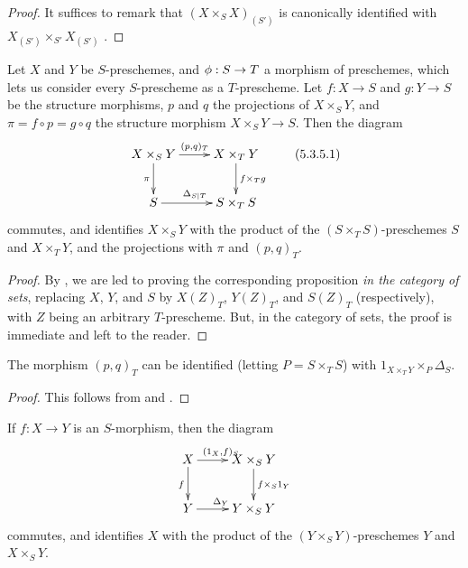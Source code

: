 \begin{proof}
It suffices to remark that $(X\times_S X)_{(S')}$ is canonically identified with $X_{(S')}\times_{S'}X_{(S')}$ .
\end{proof}

\begin{proposition}[5.3.5]
\label{I.5.3.5}
Let $X$ and $Y$ be $S$-preschemes, and $\vphi:S\to T$ a morphism of preschemes, which lets us consider every $S$-prescheme as a $T$-prescheme.
Let $f:X\to S$ and $g:Y\to S$ be the structure morphisms, $p$ and $q$ the projections of $X\times_S Y$, and $\pi=f\circ p=g\circ q$ the structure morphism $X\times_S Y\to S$.
Then the diagram
\[
  \xymatrix{
    X\times_S Y\ar[r]^{(p,q)_T}\ar[d]_\pi &
    X\times_T Y\ar[d]^{f\times_T g}\\
    S\ar[r]^{\Delta_{S|T}} &
    S\times_T S
  }
  \tag{5.3.5.1}
\]
commutes, and identifies $X\times_S Y$ with the product of the $(S\times_T S)$-preschemes $S$ and $X\times_T Y$, and the projections with $\pi$ and $(p,q)_T$.
\end{proposition}

\begin{proof}
By , we are led to proving the corresponding proposition \emph{in the category of sets}, replacing $X$, $Y$, and $S$ by $X(Z)_T$, $Y(Z)_T$, and $S(Z)_T$ (respectively), with $Z$ being an arbitrary $T$-prescheme.
But, in the category of sets, the proof is immediate and left to the reader.
\end{proof}

\begin{corollary}[5.3.6]
\label{I.5.3.6}
The morphism $(p,q)_T$ can be identified (letting $P=S\times_T S$) with $1_{X\times_T Y}\times_P\Delta_S$.
\end{corollary}

\begin{proof}
This follows from  and .
\end{proof}

\begin{corollary}[5.3.7]
\label{I.5.3.7}
If $f:X\to Y$ is an $S$-morphism, then the diagram
\[
  \xymatrix{
    X\ar[r]^{(1_X,f)_S}\ar[d]_f &
    X\times_S Y\ar[d]^{f\times_S 1_Y}\\
    Y\ar[r]^{\Delta_Y} &
    Y\times_S Y
  }
\]
commutes, and identifies $X$ with the product of the $(Y\times_S Y)$-preschemes $Y$ and $X\times_S Y$.
\end{corollary}

